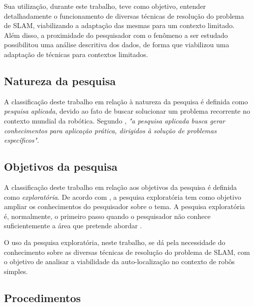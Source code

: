 		Sua utilização, durante este trabalho, teve como objetivo, entender detalhadamente o funcionamento de diversas técnicas de resolução do problema de SLAM, viabilizando a adaptação das mesmas para um contexto limitado. Além disso, a proximidade do pesquisador com o fenômeno a ser estudado possibilitou uma análise descritiva dos dados, de forma que viabilizou uma adaptação de técnicas para contextos limitados.


		\subsection{Natureza da pesquisa} %
		\label{sub:natureza_da_pesquisa}

			A classificação deste trabalho em relação à natureza da pesquisa é definida como \textit{pesquisa aplicada}, devido ao fato de buscar solucionar um problema recorrente no contexto mundial da robótica. Segundo \cite{metodologia}, \textit{"a pesquisa aplicada busca gerar conhecimentos para aplicação prática, dirigidos à solução de problemas específicos"}.

		\subsection{Objetivos da pesquisa} %
		\label{sec:classificação_quanto_aos_objetivos_da_pesquisa}

			A classificação deste trabalho em relação aos objetivos da pesquisa é definida como \textit{exploratória}. De acordo com \cite{metodologiaCientifica}, a pesquisa exploratória tem como objetivo ampliar os conhecimentos do pesquisador sobre o tema. A pesquisa exploratória é, normalmente, o primeiro passo quando o pesquisador não conhece suficientemente a área que pretende abordar \cite{metodologiaDaPesquisa}.

			O uso da pesquisa exploratória, neste trabalho, se dá pela necessidade do conhecimento sobre as diversas técnicas de resolução do problema de SLAM, com o objetivo de analisar a viabilidade da auto-localização no contexto de robôs simples.

		\subsection{Procedimentos} %
		\label{sub:procedimentos}

